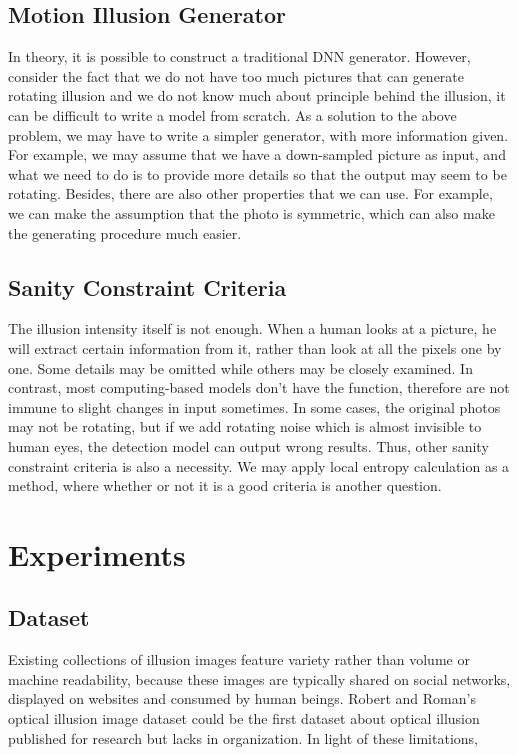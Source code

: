 \documentclass[journal]{IEEEtran}
\begin{document}
  \subsection{Motion Illusion Generator}
  \label{sec:generation_generator}
  
  In theory, it is possible to construct a traditional DNN generator. However, consider the fact that we do not have too much pictures that can generate rotating illusion and we do not know much about principle behind the illusion, it can be difficult to write a model from scratch.
  As a solution to the above problem, we may have to write a simpler generator, with more information given. For example, we may assume that we have a down-sampled picture as input, and what we need to do is to provide more details so that the output may seem to be rotating. Besides, there are also other properties that we can use. For example, we can make the assumption that the photo is symmetric, which can also make the generating procedure much easier.
  
  \subsection{Sanity Constraint Criteria}
  \label{sec:generation_criteria}
  
  The illusion intensity itself is not enough. When a human looks at a picture, he will extract certain information from it, rather than look at all the pixels one by one. Some details may be omitted while others may be closely examined. In contrast, most computing-based models don't have the function, therefore are not immune to slight changes in input sometimes. In some cases, the original photos may not be rotating, but if we add rotating noise which is almost invisible to human eyes, the detection model can output wrong results. Thus, other sanity constraint criteria is also a necessity. We may apply local entropy calculation as a method, where whether or not it is a good criteria is another question. 
  
  
  \section{Experiments}
  \label{sec:experiments}
  
  \subsection{Dataset}
  
  Existing collections of illusion images feature variety rather than volume or machine readability, because these images are typically shared on social networks, displayed on websites and consumed by human beings. Robert and Roman's optical illusion image dataset \cite{williams2018optical} could be the first dataset about optical illusion published for research but lacks in organization. In light of these limitations,
  
\end{document}
